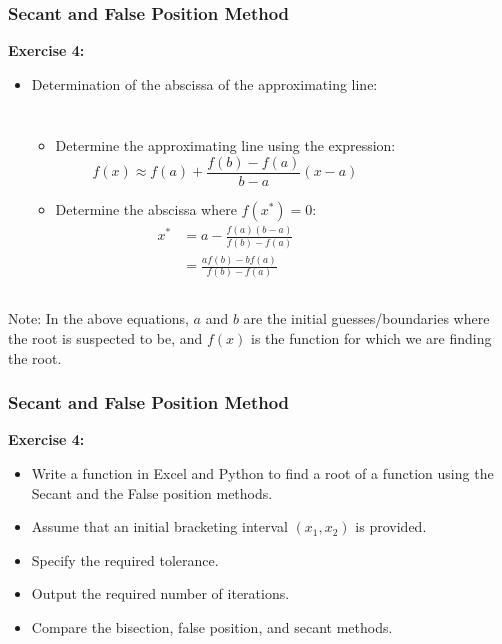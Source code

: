 \begin{frame}[fragile]
  \frametitle{Secant and False Position Method}

  \textbf{Exercise 4:}
  \begin{itemize}
    \item Determination of the abscissa of the approximating line:
    \begin{columns}
    \begin{itemize}
      \item Determine the approximating line using the expression:
      \[
      f(x) \approx f(a) + \frac{f(b) - f(a)}{b - a}(x - a)
      \]
      \item Determine the abscissa where \(f(x^*) = 0\):
        \begin{align*}
          x^* &= a - \frac{f(a)(b - a)}{f(b) - f(a)}\\
              &= \frac{af(b) - bf(a)}{f(b) - f(a)}
        \end{align*}
      \end{itemize}
        \vspace{0.5cm}
        
      \end{columns}
  \end{itemize}
  Note: In the above equations, \(a\) and \(b\) are the initial guesses/boundaries where the root is suspected to be, and \(f(x)\) is the function for which we are finding the root.
\end{frame}


\begin{frame}[fragile]
    \frametitle{Secant and False Position Method}

    \textbf{Exercise 4:}
    \begin{itemize}
      \item Write a function in Excel and Python to find a root of a function using the Secant and the False position methods.
      \item Assume that an initial bracketing interval \((x_1, x_2)\) is provided.
      \item Specify the required tolerance.
      \item Output the required number of iterations.
      \item Compare the bisection, false position, and secant methods.
    \end{itemize}
\end{frame}

